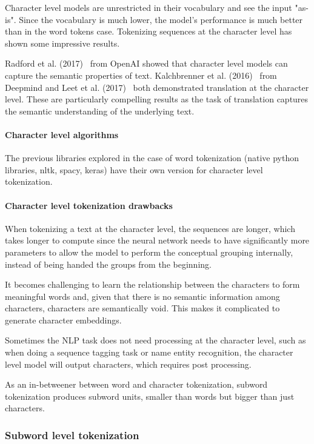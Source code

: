 Character level models are unrestricted in their vocabulary and see the input "as-is". Since the vocabulary is much lower, the model's performance is much better than in the word tokens case. Tokenizing sequences at the character level has shown some impressive results.

Radford et al. (2017)~\cite{radford2017learning} from OpenAI showed that character level models can capture the semantic properties of text. Kalchbrenner et al. (2016)~\cite{kalchbrenner2016neural} from Deepmind and Leet et al. (2017)~\cite{lee-etal-2017-fully} both demonstrated translation at the character level. These are particularly compelling results as the task of translation captures the semantic understanding of the underlying text.

\paragraph{Character level algorithms}

The previous libraries explored in the case of word tokenization (native python libraries, nltk, spacy, keras) have their own version for character level tokenization.

\paragraph{Character level tokenization drawbacks}

When tokenizing a text at the character level, the sequences are longer, which takes longer to compute since the neural network needs to have significantly more parameters to allow the model to perform the conceptual grouping internally, instead of being handed the groups from the beginning.

It becomes challenging to learn the relationship between the characters to form meaningful words and, given that there is no semantic information among characters, characters are semantically void. This makes it complicated to generate character embeddings.

Sometimes the NLP task does not need processing at the character level, such as when doing a sequence tagging task or name entity recognition, the character level model will output characters, which requires post processing.

As an in-betweener between word and character tokenization, subword tokenization produces subword units, smaller than words but bigger than just characters.

\subsubsection{Subword level tokenization}

